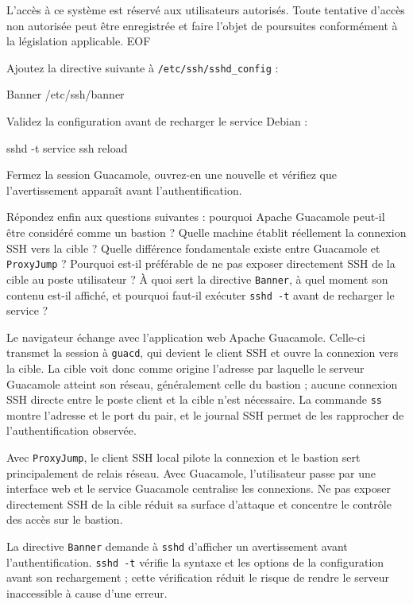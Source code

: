 \documentclass[a4paper,10pt]{exam}
\begin{document}
\begin{questions}
\begin{bashcode}
L'accès à ce système est réservé aux utilisateurs autorisés.
Toute tentative d'accès non autorisée peut être enregistrée et faire
l'objet de poursuites conformément à la législation applicable.
EOF
\end{bashcode}
Ajoutez la directive suivante à \texttt{/etc/ssh/sshd\_config} :
\begin{bashcode}
Banner /etc/ssh/banner
\end{bashcode}
Validez la configuration avant de recharger le service Debian :
\begin{bashcode}
sshd -t
service ssh reload
\end{bashcode}
Fermez la session Guacamole, ouvrez-en une nouvelle et vérifiez que l'avertissement
apparaît avant l'authentification.

Répondez enfin aux questions suivantes : pourquoi Apache Guacamole peut-il être considéré
comme un bastion ? Quelle machine établit réellement la connexion SSH vers la cible ?
Quelle différence fondamentale existe entre Guacamole et \texttt{ProxyJump} ? Pourquoi
est-il préférable de ne pas exposer directement SSH de la cible au poste utilisateur ?
À quoi sert la directive \texttt{Banner}, à quel moment son contenu est-il affiché, et
pourquoi faut-il exécuter \texttt{sshd -t} avant de recharger le service ?
\begin{solution}
Le navigateur échange avec l'application web Apache Guacamole. Celle-ci transmet la
session à \texttt{guacd}, qui devient le client SSH et ouvre la connexion vers la cible.
La cible voit donc comme origine l'adresse par laquelle le serveur Guacamole atteint son
réseau, généralement celle du bastion ; aucune connexion SSH directe entre le poste client
et la cible n'est nécessaire. La commande \texttt{ss} montre l'adresse et le port du pair,
et le journal SSH permet de les rapprocher de l'authentification observée.

Avec \texttt{ProxyJump}, le client SSH local pilote la connexion et le bastion sert
principalement de relais réseau. Avec Guacamole, l'utilisateur passe par une interface web
et le service Guacamole centralise les connexions. Ne pas exposer directement SSH de la
cible réduit sa surface d'attaque et concentre le contrôle des accès sur le bastion.

La directive \texttt{Banner} demande à \texttt{sshd} d'afficher un avertissement avant
l'authentification. \texttt{sshd -t} vérifie la syntaxe et les options de la configuration
avant son rechargement ; cette vérification réduit le risque de rendre le serveur
inaccessible à cause d'une erreur.
\end{solution}
\end{questions}
\end{document}
